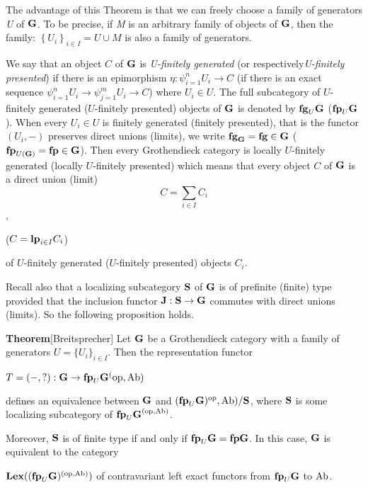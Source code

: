 \documentclass[12pt]{article}
\theoremstyle{plain}
\theoremstyle{definition}
\numberwithin{equation}{section}
\begin{document}
The advantage of this Theorem is that we can freely choose a family of
generators {\em U} of ${\bf G}$. To be precise, if {\em M} is an arbitrary
family of objects of ${\bf G}$, then the family: 
$\left\{U_i\right\}_{i \in I}= U \cup M$ is also a family of generators.

We say that an object $C$ of ${\bf G}$ is {\em U-finitely generated}
(or respectively{\em U-finitely presented}) if there is an epimorphism
$\eta:\psi_{i=1}^n U_i \to C$ (if there is an exact sequence
$\psi_{i=1}^nU_i\to\psi_{j=1}^mU_i\to C$) where $U_i \in U$. The full
subcategory of $U$-finitely generated ($U$-finitely presented)
objects of ${\bf G}$  is denoted by ${\bf fg}_U {\bf G}$ (${\bf fp}_U {\bf G}$).
When every $U_i \in U$ is finitely generated (finitely presented), that is
the functor $(U_i,-)$ preserves direct unions (limits), we write
${\bf fg}_{\bf G} = {\bf fg} \in {\bf G}$ (${\bf fp}_{U({\bf G})} ={\bf fp} \in {\bf G}$). Then every Grothendieck category is locally $U$-finitely generated
(locally $U$-finitely presented) which means that every object $C$ of ${\bf G}$
is a direct union (limit) $$C= \sum_{i\in I}C_i$$ , 

\bigbreak
($C={\bf lp}_{i\in I}C_i$)

 
of $U$-finitely generated ($U$-finitely presented) objects $C_i$.

Recall also that a localizing subcategory ${\bf S}$ of ${\bf G}$ is of prefinite
(finite) type provided that the inclusion functor ${\bf J}: {\bf S} \to {\bf G}$
commutes with direct unions (limits). So the following proposition holds.


{\bf Theorem}[Breitsprecher]
Let ${\bf G}$ be a Grothendieck category with a family of generators
$U=\{U_i\}_{i\in I}$. Then the representation functor

$T=(-,?): {\bf G} \to {\bf fp}_U{\bf G}^({\rm op},{\rm Ab})$

defines an equivalence between ${\bf G}$ and $({\bf fp}_U {\bf G})^{{\rm op}},{\rm Ab})/{\bf S}$,
where ${\bf S}$ is some localizing subcategory of 
${{\bf fp}_U {\bf G}}^{({\rm op},{\rm Ab})}$.

Moreover, ${\bf S}$
is of finite type if and only if ${\bf fp}_U {\bf G}= {\bf fp}{\bf G}$. 
In this case, ${\bf G}$ is equivalent to the category

${\bf Lex}(({\bf fp}_U {\bf G})^{({\rm op},{\rm Ab})})$ of contravariant
left exact functors from ${\bf fp}_U {\bf G}$ to ${\rm Ab}$.
\end{document}
